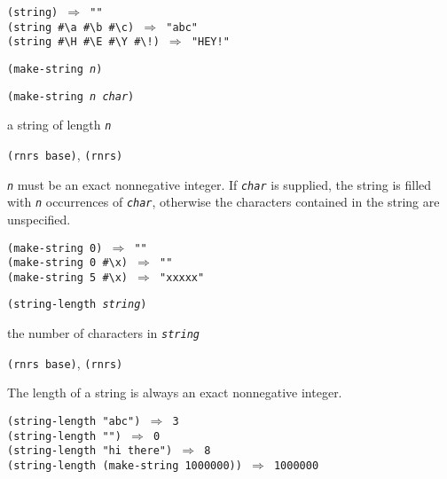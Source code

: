 \begin{alltt}
(string) \(\Rightarrow\) ""
(string \#{}\textbackslash{}a \#{}\textbackslash{}b \#{}\textbackslash{}c) \(\Rightarrow\) "abc"
(string \#{}\textbackslash{}H \#{}\textbackslash{}E \#{}\textbackslash{}Y \#{}\textbackslash{}!) \(\Rightarrow\) "HEY!"
\end{alltt}

\begin{description}

\label{objects_s218}\item[procedure] \texttt{(make-string \textit{n})}



\item[procedure] \texttt{(make-string \textit{n} \textit{char})}



\item[returns] a string of length \texttt{\textit{n}}


\item[libraries] \texttt{(rnrs base)}, \texttt{(rnrs)}
\end{description}

\texttt{\textit{n}} must be an exact nonnegative integer.
If \texttt{\textit{char}} is supplied, the string is filled with \texttt{\textit{n}}
occurrences of \texttt{\textit{char}},
otherwise the characters contained in the string are unspecified.

\begin{alltt}
(make-string 0) \(\Rightarrow\) ""
(make-string 0 \#{}\textbackslash{}x) \(\Rightarrow\) ""
(make-string 5 \#{}\textbackslash{}x) \(\Rightarrow\) "xxxxx"
\end{alltt}

\begin{description}

\label{objects_s219}\item[procedure] \texttt{(string-length \textit{string})}



\item[returns] the number of characters in \texttt{\textit{string}}


\item[libraries] \texttt{(rnrs base)}, \texttt{(rnrs)}
\end{description}


The length of a string is always an exact nonnegative integer.


\begin{alltt}
(string-length "abc") \(\Rightarrow\) 3
(string-length "") \(\Rightarrow\) 0
(string-length "hi there") \(\Rightarrow\) 8
(string-length (make-string 1000000)) \(\Rightarrow\) 1000000
\end{alltt}

